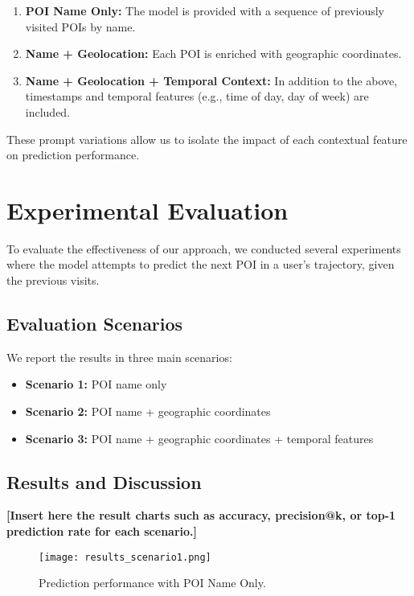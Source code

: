 \documentclass[a4paper,12pt]{article}
\begin{document}
\begin{enumerate}
    \item \textbf{POI Name Only:} The model is provided with a sequence of previously visited POIs by name.
    \item \textbf{Name + Geolocation:} Each POI is enriched with geographic coordinates.
    \item \textbf{Name + Geolocation + Temporal Context:} In addition to the above, timestamps and temporal features (e.g., time of day, day of week) are included.
\end{enumerate}

These prompt variations allow us to isolate the impact of each contextual feature on prediction performance.

\section{Experimental Evaluation}

To evaluate the effectiveness of our approach, we conducted several experiments where the model attempts to predict the next POI in a user's trajectory, given the previous visits.

\subsection{Evaluation Scenarios}

We report the results in three main scenarios:

\begin{itemize}
    \item \textbf{Scenario 1:} POI name only
    \item \textbf{Scenario 2:} POI name + geographic coordinates
    \item \textbf{Scenario 3:} POI name + geographic coordinates + temporal features
\end{itemize}

\subsection{Results and Discussion}

\textbf{[Insert here the result charts such as accuracy, precision@k, or top-1 prediction rate for each scenario.]}

\begin{figure}[H]
    \centering
    \texttt{[image: results\_scenario1.png]}
    \caption{Prediction performance with POI Name Only.}
\end{figure}
\end{document}

